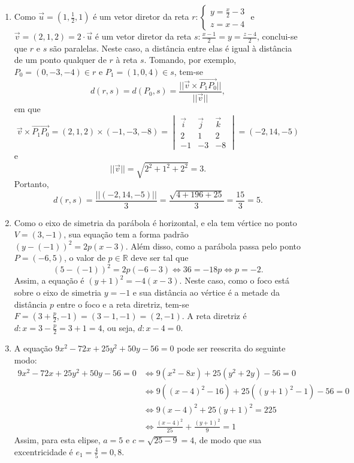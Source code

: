\documentclass[12pt,a4paper]{article}
\newcommand{\vect}[1]{\overrightarrow{#1}}
\begin{document}
\begin{enumerate}
\item Como $\vec{u}=(1,\frac{1}{2},1)$ é um vetor diretor da reta $r: \begin{cases}
y = \frac{x}{2} - 3\\
z= x - 4
\end{cases}$ e $\vec{v}=(2,1,2) = 2 \cdot \vec{u}$ é um vetor diretor da reta $s: \frac{x-1}{2} = y = \frac{z-4}{2}$, conclui-se que $r$ e $s$ são paralelas. Neste caso, a distância entre elas é igual à distância de um ponto qualquer de $r$ à reta $s$. Tomando, por exemplo, $P_0 = (0, -3, -4) \in r$ e $P_1 = (1, 0, 4) \in s$, tem-se
\[
d(r,s)
= d(P_0,s)
= \frac{|| \vec{v} \times \vect{P_1 P_0} ||}{|| \vec{v} ||},
\]
em que
\[
\vec{v} \times \vect{P_1 P_0}
=(2,1,2) \times (-1,-3,-8)
=\begin{vmatrix}
\vec{i} & \vec{j} & \vec{k}\\
 2 &  1 &  2\\
-1 & -3 & -8
\end{vmatrix}
= (-2, 14, -5)
\]
e
\[
|| \vec{v} || = \sqrt{2^2+1^2+2^2} = 3.
\]
Portanto,
\[
d(r,s)
= \frac{|| (-2, 14, -5) || }{3}
= \frac{\sqrt{4+196+25} }{3}
= \frac{15}{3}
= 5.
\]

\item Como o eixo de simetria da parábola é horizontal, e ela tem vértice no ponto $V = (3,-1)$, sua equação tem a forma padrão $(y-(-1))^2 = 2p(x-3)$. Além disso, como a parábola passa pelo ponto $P=(-6,5)$, o valor de $p \in \mathbb{R}$ deve ser tal que
\[
(5-(-1))^2 = 2p(-6-3)
\Leftrightarrow
36 = -18p
\Leftrightarrow
p = -2.
\]
Assim, a equação é $(y+1)^2 = -4(x-3)$. Neste caso, como o foco está sobre o eixo de simetria $y=-1$ e sua distância ao vértice é a metade da distância $p$ entre o foco e a reta diretriz, tem-se $F=(3+\frac{p}{2},-1) = (3-1,-1) = (2,-1)$. A reta diretriz é $d: x = 3-\frac{p}{2} = 3 + 1 = 4$, ou seja, $d: x-4 = 0$.

\item A equação $9 x^2-72 x+25 y^2+50 y-56 = 0$ pode ser reescrita do seguinte modo:
\begin{align*}
9 x^2-72 x+25 y^2+50 y-56 = 0
& \Leftrightarrow
9 (x^2 - 8x) + 25(y^2 +2y) - 56 = 0\\
& \Leftrightarrow
9 ((x-4)^2 - 16) + 25((y+1)^2 -1) - 56 = 0\\
& \Leftrightarrow
9(x-4)^2 + 25(y+1)^2 = 225\\
& \Leftrightarrow
\frac{(x-4)^2}{25} + \frac{(y+1)^2}{9} = 1
\end{align*}
Assim, para esta elipse, $a=5$ e $c=\sqrt{25-9}=4$, de modo que sua excentricidade é $e_1 = \frac{4}{5} = 0,8$.


\end{enumerate}
\end{document}
